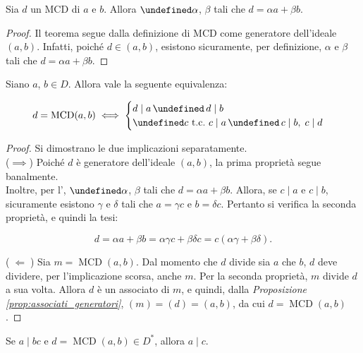 \documentclass[a4paper]{article}
\DeclareMathOperator{\MCD}{MCD}
\let\oldforall\forall
\let\forall\undefined
\DeclareMathOperator{\forall}{\oldforall}
\let\oldexists\exists
\let\exists\undefined
\DeclareMathOperator{\exists}{\oldexists}
\let\oldland\land
\let\land\undefined
\DeclareMathOperator{\land}{\oldland}
\begin{document}
\begin{theorem}
    \label{th:bezout}
    Sia $d$ un MCD di $a$ e $b$. Allora
    $\exists \alpha$, $\beta$ tali che $d = \alpha a + \beta b$.
\end{theorem}

\begin{proof}
    Il teorema segue dalla definizione di MCD come generatore
    dell'ideale $(a,b)$. Infatti, poiché $d \in (a,b)$, esistono
    sicuramente, per definizione, $\alpha$ e $\beta$ tali che
    $d = \alpha a + \beta b$.
\end{proof}

\begin{proposition}
    \label{prop:mcd}
    Siano $a$, $b \in D$. Allora vale la seguente equivalenza:

    \[ d = \MCD(a, b) \iff \begin{cases} d \mid a \,\land\, d \mid b \\ \forall c \text{ t.c.\ } c \mid a \,\land\, c \mid b,\;c \mid d\end{cases}\]
\end{proposition}

\begin{proof} Si dimostrano le due implicazioni separatamente. \\

    ($\implies$) Poiché $d$ è generatore dell'ideale $(a, b)$, la prima proprietà segue banalmente. \\

    Inoltre, per l', $\exists \alpha$, $\beta$ tali che
    $d = \alpha a + \beta b$. Allora, se $c \mid a$ e $c \mid b$, sicuramente
    esistono $\gamma$ e $\delta$ tali che $a=\gamma c$ e $b=\delta c$. Pertanto
    si verifica la seconda proprietà, e quindi la tesi:

    \[ d = \alpha a + \beta b = \alpha \gamma c + \beta \delta c = c(\alpha\gamma+\beta\delta). \]

    \vskip 0.1in

    ($\;\Longleftarrow\;$) Sia $m = \MCD(a,b)$. Dal momento che $d$ divide
    sia $a$ che $b$, $d$ deve dividere, per l'implicazione scorsa, anche $m$.
    Per la seconda proprietà, $m$ divide $d$ a sua volta. Allora $d$ è un
    associato di $m$, e quindi, dalla \textit{Proposizione \ref{prop:associati_generatori}}, $(m)=(d)=(a,b)$, da cui $d = \MCD(a,b)$.
\end{proof}

\begin{proposition}
    \label{prop:divisione_gcd}
    Se $a \mid bc$ e $d = \MCD(a, b) \in D^*$, allora $a \mid c$.
\end{proposition}
\end{document}

